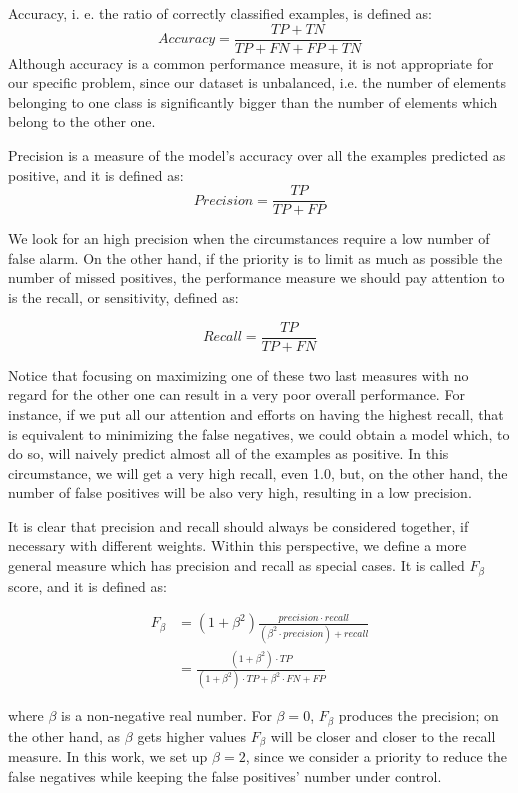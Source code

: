 \documentclass[a4paper, twoside]{article}
\begin{document}
    Accuracy, i. e. the ratio of correctly classified examples, is defined as:
    $$Accuracy = \frac{TP + TN}{TP + FN + FP + TN} $$
    Although accuracy is a common performance measure, it is not appropriate for our specific problem, since our dataset is unbalanced, i.e. the number of elements belonging to one class is significantly bigger than the number of elements which belong to the other one.


    Precision is a measure of the model's accuracy over all the examples predicted as positive, and it is defined as:
    $$ Precision = \frac{TP}{TP + FP}$$

    We look for an high precision when the circumstances require a low number of false alarm. On the other hand, if the priority is to limit as much as possible the number of missed positives, the performance measure we should pay attention to is the recall, or sensitivity, defined as:

    $$ Recall = \frac{TP}{TP + FN} $$

    Notice that focusing on maximizing one of these two last measures with no regard for the other one can result in a very poor overall performance. For instance, if we put all our attention and efforts on having the highest recall, that is equivalent to minimizing the false negatives, we could obtain a model which, to do so, will naively predict almost all of the examples as positive. In this circumstance, we will get a very high recall, even 1.0, but, on the other hand, the number of false positives will be also very high, resulting in a low precision.

    It is clear that precision and recall should always be considered together, if necessary with different weights. Within this perspective, we define a more general measure which has precision and recall as special cases. It is called $F_{\beta}$ score, and it is defined as:

    \begin{equation*} \label{eq1}
    \begin{split}
    F_{\beta} & = (1 + \beta^2)\frac{precision \cdot recall}{(\beta^2 \cdot precision) + recall} \\
     & = \frac{(1 + \beta^2) \cdot TP}{(1 + \beta^2) \cdot TP + \beta^2 \cdot FN + FP}
    \end{split}
    \end{equation*}

    where $\beta$ is a non-negative real number. For $\beta = 0$, $F_{\beta}$ produces the precision; on the other hand, as $\beta$ gets higher values $F_{\beta}$ will be closer and closer to the recall measure. In this work, we set up $\beta = 2$, since we consider a priority to reduce the false negatives while keeping the false positives' number under control.
\end{document}
